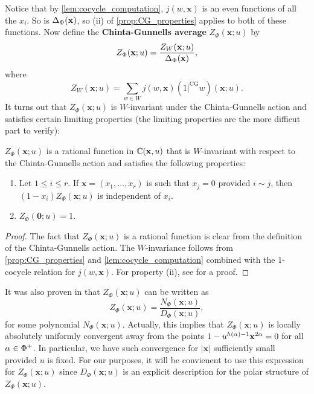         Notice that by \cref{lem:cocycle_computation}, $j(w,\mathbf{x})$ is an even functions of all the $x_{i}$. So is $\Delta_{\Phi}(\mathbf{x})$, so (ii) of \cref{prop:CG_properties} applies to both of these functions. Now define the \textbf{Chinta-Gunnells average} $Z_{\Phi}(\mathbf{x};u)$ by
        \[
            Z_{\Phi}(\mathbf{x};u) = \frac{Z_{W}(\mathbf{x};u)}{\Delta_{\Phi}(\mathbf{x})},
        \]
        where
        \[
            Z_{W}(\mathbf{x};u) = \sum_{w \in W}j(w,\mathbf{x})(1|^{\mathrm{CG}}w)(\mathbf{x};u).
        \]
        It turns out that $Z_{\Phi}(\mathbf{x};u)$ is $W$-invariant under the Chinta-Gunnells action and satisfies certain limiting properties (the limiting properties are the more difficut part to verify):

        \begin{theorem}\label{thm:invariant_function}
            $Z_{\Phi}(\mathbf{x};u)$ is a rational function in $\mathbb{C}(\mathbf{x},u)$ that is $W$-invariant with respect to the Chinta-Gunnells action and satisfies the following properties:
            \begin{enumerate}[label=(\roman*)]
                \item Let $1 \le i \le r$. If $\mathbf{x} = (x_{1},\ldots,x_{r})$ is such that $x_{j} = 0$ provided $i \sim j$, then $(1-x_{i})Z_{\Phi}(\mathbf{x};u)$ is independent of $x_{i}$.
                \item $Z_{\Phi}(\mathbf{0};u) = 1$.
            \end{enumerate}
        \end{theorem}
        \begin{proof}
            The fact that $Z_{\Phi}(\mathbf{x};u)$ is a rational function is clear from the definition of the Chinta-Gunnells action. The $W$-invariance follows from \cref{prop:CG_properties} and \cref{lem:cocycle_computation} combined with the $1$-cocycle relation for $j(w,\mathbf{x})$. For property (ii), see \cite{chinta2008parts} for a proof.
        \end{proof}

        It was also proven in \cite{chinta2008parts} that $Z_{\Phi}(\mathbf{x};u)$ can be written as
        \[
            Z_{\Phi}(\mathbf{x};u) = \frac{N_{\Phi}(\mathbf{x};u)}{D_{\Phi}(\mathbf{x};u)},
        \]
        for some polynomial $N_{\Phi}(\mathbf{x};u)$. Actually, this implies that $Z_{\Phi}(\mathbf{x};u)$ is locally absolutely uniformly convergent away from the points $1-u^{h(\alpha)-1}\mathbf{x}^{2\alpha} = 0$ for all $\alpha \in \Phi^{+}$. In particular, we have such convergence for $|\mathbf{x}|$ sufficiently small provided $u$ is fixed. For our purposes, it will be convienent to use this expression for $Z_{\Phi}(\mathbf{x};u)$ since $D_{\Phi}(\mathbf{x};u)$ is an explicit description for the polar structure of $Z_{\Phi}(\mathbf{x};u)$.
        
